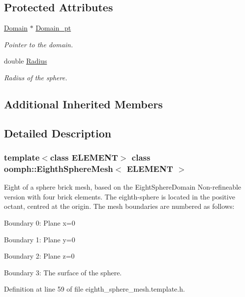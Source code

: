 \subsection*{Protected Attributes}
\begin{DoxyCompactItemize}
\item 
\hyperlink{classoomph_1_1Domain}{Domain} $\ast$ \hyperlink{classoomph_1_1EighthSphereMesh_a4b08d71a9da8cbd278cc51919cbb1a17}{Domain\+\_\+pt}
\begin{DoxyCompactList}\small\item\em Pointer to the domain. \end{DoxyCompactList}\item 
double \hyperlink{classoomph_1_1EighthSphereMesh_a6dbcd3a6d27416a0d9ef25cc631f6043}{Radius}
\begin{DoxyCompactList}\small\item\em Radius of the sphere. \end{DoxyCompactList}\end{DoxyCompactItemize}
\subsection*{Additional Inherited Members}


\subsection{Detailed Description}
\subsubsection*{template$<$class E\+L\+E\+M\+E\+NT$>$\newline
class oomph\+::\+Eighth\+Sphere\+Mesh$<$ E\+L\+E\+M\+E\+N\+T $>$}

Eight of a sphere brick mesh, based on the Eight\+Sphere\+Domain Non-\/refineable version with four brick elements. The eighth-\/sphere is located in the positive octant, centred at the origin. The mesh boundaries are numbered as follows\+:
\begin{DoxyItemize}
\item Boundary 0\+: Plane x=0
\item Boundary 1\+: Plane y=0
\item Boundary 2\+: Plane z=0
\item Boundary 3\+: The surface of the sphere. 
\end{DoxyItemize}

Definition at line 59 of file eighth\+\_\+sphere\+\_\+mesh.\+template.\+h.



